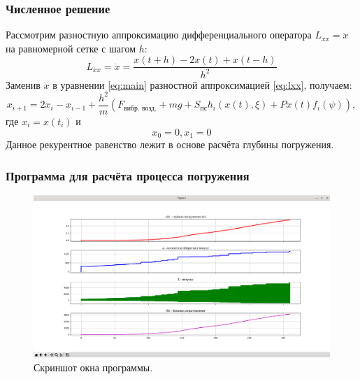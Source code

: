 \documentclass{beamer}
\begin{document}
    \begin{frame}
        \frametitle{Численное решение}
        Рассмотрим разностную аппроксимацию дифференциального оператора $L_{xx} = \ddot{x}$ на равномерной сетке с шагом $h$:
        \begin{equation}
            \label{eq:lxx}
            L_{xx} = \ddot{x} = \frac{x(t + h) - 2x(t) + x(t - h)}{h^2}
        \end{equation}
        Заменив $\ddot{x}$ в уравнении \ref{eq:main} разностной аппроксимацией \ref{eq:lxx}, получаем:
        \begin{equation*}
                x_{i+1} = 2x_i - x_{i-1} + \frac{h^2}{m}(F_\text{вибр. возд.} + mg + S_\text{пс} h_i(x(t), \xi) + P x(t) f_i(\psi)),
        \end{equation*}
        где $x_i = x(t_i)$ и 
        \begin{equation*}
            x_0 = 0, x_1 = 0
        \end{equation*}
        Данное рекурентное равенство лежит в основе расчёта глубины погружения.
    \end{frame}

    \begin{frame}
        \frametitle{Программа для расчёта процесса погружения}
        \begin{figure}
            \includegraphics[width=1\linewidth]{screenshot}
            \caption{Скриншот окна программы.}
        \end{figure}
    \end{frame}
\end{document}
